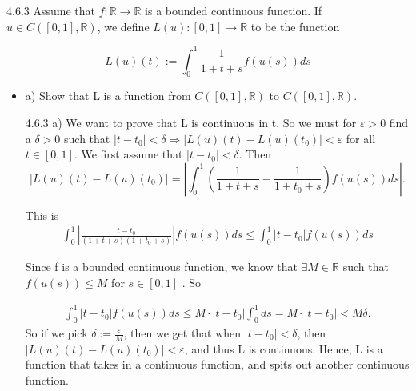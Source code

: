 \documentclass[a4paper,norsk]{article}
\renewcommand{\leq}{\leqslant}
\renewcommand{\epsilon}{\varepsilon}
\begin{document}
\begin{oppgavebox}{4.6.3}{}
Assume that $ f : \mathbb{R} \to \mathbb{R} $ is a bounded continuous function. If $ u \in C \left( \left[ 0, 1 \right] , \mathbb{R} \right)  $, we define $ L \left( u \right) : \left[ 0, 1 \right] \to \mathbb{R} $ to be the function

\[
    L \left( u \right) \left( t \right) := \int_{0}^{1} \frac{ 1 }{ 1+t+s }f \left( u(s) \right) ds
\]

\begin{itemize}
  \item a) Show that L is a function from $ C \left( \left[ 0, 1 \right] , \mathbb{R} \right)  $ to $ C \left( \left[ 0, 1 \right] , \mathbb{R} \right)  $.
  
  \begin{proofbox}{4.6.3 a)}{}
    We want to prove that L is continuous in t. So we must for $ \epsilon > 0 $ find a $ \delta > 0 $ such that $ \left| t - t_0 \right| < \delta  \Rightarrow \left| L \left( u \right) (t) - L \left( u \right) (t_0)  \right| < \epsilon   $ for all $ t \in \left[ 0, 1 \right]  $. We first assume that $ \left| t - t_0  \right| < \delta  $. Then 
    \[
        \left| L (u) (t) - L (u) (t_0)  \right| = \left| \int_{0}^{1} \left( \frac{ 1 }{ 1 +t+s } - \frac{ 1 }{ 1+t_0+s } \right) f \left( u(s) \right) ds    \right|.
    \]
    
    This is 
    \begin{align*}
      \int_{0}^{1} \left| \frac{ t - t_0 }{ \left( 1+t+s \right) \left( 1+t_0+s \right)  } \right| f (u(s)) ds \leq \int_{0}^{1} \left| t - t_0 \right| f(u(s)) ds    
    \end{align*}
    
    Since f is a bounded continuous function, we know that $ \exists M \in \mathbb{R} $ such that  $ f(u(s)) \leq  M $ for $ s \in \left[ 0, 1 \right]  $ . So 
    
    \begin{align*}
      \int_{0}^{1} \left| t - t_0 \right| f(u(s)) ds   \leq M \cdot \left| t - t_0 \right| \int_{0}^{1} ds = M \cdot \left| t-t_0 \right| < M \delta.
    \end{align*}
    So if we pick $ \delta := \frac{ \epsilon    }{ M } $, then we get that when $ \left| t-t_0 \right| < \delta  $, then $ \left| L(u)(t) - L(u)(t_0) \right| < \epsilon  $, and thus L is continuous. Hence, L is a function that takes in a continuous function, and spits out another continuous function.    
    
  \end{proofbox}


\end{itemize}
\end{oppgavebox}
\end{document}
